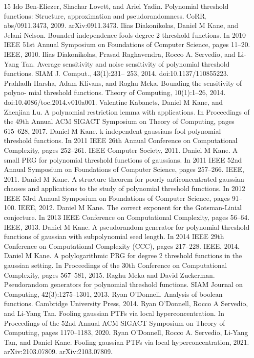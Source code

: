 \begin{thebibliography}{15}
 Ido Ben-Eliezer, Shachar Lovett, and Ariel Yadin. Polynomial threshold functions: Structure, approximation and pseudorandomness. CoRR, abs/0911.3473, 2009. arXiv:0911.3473.
 Ilias Diakonikolas, Daniel M Kane, and Jelani Nelson. Bounded independence fools degree-2 threshold functions. In 2010 IEEE 51st Annual Symposium on Foundations of Computer Science, pages 11–20. IEEE, 2010.
 Ilias Diakonikolas, Prasad Raghavendra, Rocco A. Servedio, and Li-Yang Tan. Average sensitivity and noise sensitivity of polynomial threshold functions. SIAM J. Comput., 43(1):231– 253, 2014. doi:10.1137/110855223.
 Prahladh Harsha, Adam Klivans, and Raghu Meka. Bounding the sensitivity of polyno- mial threshold functions. Theory of Computing, 10(1):1–26, 2014. doi:10.4086/toc.2014.v010a001.
 Valentine Kabanets, Daniel M Kane, and Zhenjian Lu. A polynomial restriction lemma with applications. In Proceedings of the 49th Annual ACM SIGACT Symposium on Theory of Computing, pages 615–628, 2017.
 Daniel M Kane. k-independent gaussians fool polynomial threshold functions. In 2011 IEEE 26th Annual Conference on Computational Complexity, pages 252–261. IEEE Computer Society, 2011.
 Daniel M Kane. A small PRG for polynomial threshold functions of gaussians. In 2011 IEEE 52nd Annual Symposium on Foundations of Computer Science, pages 257–266. IEEE, 2011.
 Daniel M Kane. A structure theorem for poorly anticoncentrated gaussian chaoses and applications to the study of polynomial threshold functions. In 2012 IEEE 53rd Annual Symposium on Foundations of Computer Science, pages 91–100. IEEE, 2012.
 Daniel M Kane. The correct exponent for the Gotsman-Linial conjecture. In 2013 IEEE Conference on Computational Complexity, pages 56–64. IEEE, 2013.
 Daniel M Kane. A pseudorandom generator for polynomial threshold functions of gaussian with subpolynomial seed length. In 2014 IEEE 29th Conference on Computational Complexity (CCC), pages 217–228. IEEE, 2014.
 Daniel M Kane. A polylogarithmic PRG for degree 2 threshold functions in the gaussian setting. In Proceedings of the 30th Conference on Computational Complexity, pages 567–581, 2015.
 Raghu Meka and David Zuckerman. Pseudorandom generators for polynomial threshold functions. SIAM Journal on Computing, 42(3):1275–1301, 2013.
 Ryan O’Donnell. Analysis of boolean functions. Cambridge University Press, 2014.
 Ryan O’Donnell, Rocco A Servedio, and Li-Yang Tan. Fooling gaussian PTFs via local hyperconcentration. In Proceedings of the 52nd Annual ACM SIGACT Symposium on Theory of Computing, pages 1170–1183, 2020.
 Ryan O’Donnell, Rocco A. Servedio, Li-Yang Tan, and Daniel Kane. Fooling gaussian PTFs via local hyperconcentration, 2021. arXiv:2103.07809. arXiv:2103.07809.
\end{thebibliography}
